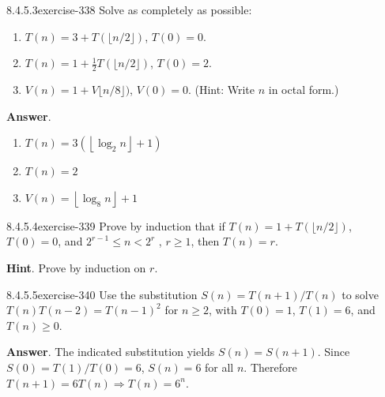 \documentclass[twoside,10pt,]{book}
\numberwithin{equation}{section}
\begin{document}
\begin{divisionsolution}{8.4.5.3}{}{exercise-338}%
\hypertarget{p-2810}{}%
Solve as completely as possible:%
\par
\hypertarget{p-2811}{}%
\leavevmode%
\begin{enumerate}[label=(\alph*)]
\item\hypertarget{li-1374}{}\hypertarget{p-2812}{}%
\(T(n) = 3 + T(\lfloor n/2\rfloor )\), \(T(0) = 0\).%
\item\hypertarget{li-1375}{}\hypertarget{p-2813}{}%
\(T(n) = 1 + \frac{1}{2}T(\lfloor n/2\rfloor )\), \(T(0) = 2\).%
\item\hypertarget{li-1376}{}\hypertarget{p-2814}{}%
\(V(n) = 1 + V\lfloor n/8\rfloor )\), \(V(0) = 0\). (Hint: Write \(n\) in octal form.)%
\end{enumerate}
%
\par\smallskip%
\noindent\textbf{Answer}.\quad%
\hypertarget{p-2815}{}%
\leavevmode%
\begin{enumerate}[label=(\alph*)]
\item\hypertarget{li-1377}{}\hypertarget{p-2816}{}%
\(T(n)=3\left(\left\lfloor \log_2n\right\rfloor +1\right)\)%
\item\hypertarget{li-1378}{}\hypertarget{p-2817}{}%
\(T(n)=2\)%
\item\hypertarget{li-1379}{}\hypertarget{p-2818}{}%
\(V(n)=\left\lfloor \log_8n\right\rfloor +1\)%
\end{enumerate}
%
\end{divisionsolution}%
\begin{divisionsolution}{8.4.5.4}{}{exercise-339}%
\hypertarget{p-2819}{}%
Prove by induction that if \(T(n)= 1 + T (\lfloor n/2 \rfloor )\), \(T(0) = 0\), and \(2^{r-1}\leq n < 2^r\) , \(r \geq  1\), then \(T(n) = r\).%
\par\smallskip%
\noindent\textbf{Hint}.\quad%
\hypertarget{p-2820}{}%
Prove by induction on \(r\).%
\end{divisionsolution}%
\begin{divisionsolution}{8.4.5.5}{}{exercise-340}%
\hypertarget{p-2821}{}%
Use the substitution \(S(n) = T(n+1)/T(n)\)  to solve \(T(n)T(n-2)=T(n-1)^2\) for \(n \geq  2\), with \(T(0) = 1\), \(T(1) = 6\), and \(T(n) \geq  0\).%
\par\smallskip%
\noindent\textbf{Answer}.\quad%
\hypertarget{p-2822}{}%
The indicated substitution yields \(S(n)=S(n+1)\). Since \(S(0)=T(1)/T(0)=6\), \(S(n)=6\) for all \(n\). Therefore \(T(n+1)=6T(n)\Rightarrow T(n)=6^n\).%
\end{divisionsolution}%
\end{document}
